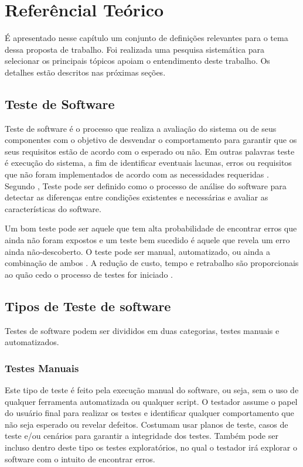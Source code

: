 \chapter{Referêncial Teórico}


É apresentado nesse capítulo um conjunto de definições relevantes para o tema dessa proposta de trabalho. Foi realizada uma pesquisa sistemática para selecionar os principais tópicos apoiam o entendimento deste trabalho. Os detalhes estão descritos nas próximas seções.

\section{Teste de Software}

Teste de software é o processo que realiza a avaliação do sistema ou de seus componentes com o objetivo de desvendar o comportamento para garantir que os seus requisitos estão de acordo com o esperado ou não. Em outras palavras teste é execução do sistema, a fim de identificar eventuais lacunas, erros ou requisitos que não foram implementados de acordo com as necessidades requeridas \cite{tutorialsPoint}. Segundo \cite{ansiieee1059}, Teste pode ser definido como o processo de análise do software para detectar as diferenças entre condições existentes e necessárias e avaliar as características do software.

Um bom teste pode ser aquele que tem alta probabilidade de encontrar erros que ainda não foram expostos e um teste bem sucedido é aquele que revela um erro ainda não-descoberto. O teste pode ser manual, automatizado, ou ainda a combinação de ambos \cite{Pressman2002}. A redução de custo, tempo e retrabalho são proporcionais ao quão cedo o processo de testes for iniciado \cite{tutorialsPoint}.

\section{Tipos de Teste de software}

Testes de software podem ser divididos em duas categorias, testes manuais e automatizados.

\subsection{Testes Manuais}

		Este tipo de teste é feito pela execução manual do software, ou seja, sem o uso de qualquer ferramenta automatizada ou qualquer script. O testador assume o papel do usuário final para realizar os testes e identificar qualquer comportamento que não seja esperado ou revelar defeitos. Costumam usar planos de teste, casos de teste e/ou cenários para garantir a integridade dos testes. Também pode ser incluso dentro deste tipo os testes exploratórios, no qual o testador irá explorar o software com o intuito de encontrar erros\cite{tutorialsPoint}.
		
